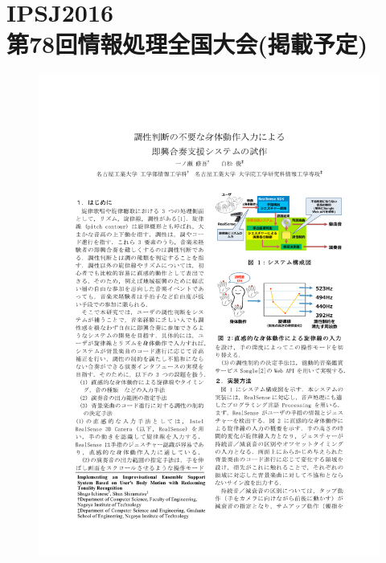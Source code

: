 \cleardoublepage
\chapter{IPSJ2016\\第78回情報処理全国大会(掲載予定)}

\begin{figure}[ht]
    \begin{center}
        \includegraphics[width=1.0\linewidth]{part/B.IPSJ2015/ichinose160105_1.pdf}
    \end{center}
\end{figure}

\newpage
\clearpage

